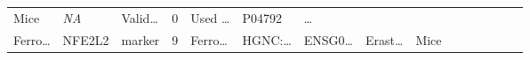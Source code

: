 \documentclass[
]{article}
\begin{document}
\begin{longtable}[]{@{}lllllllllllllll@{}}
\begin{minipage}[t]{0.04\columnwidth}
Mice\strut
\end{minipage} & \begin{minipage}[t]{0.05\columnwidth}\raggedright
\emph{NA}\strut
\end{minipage} & \begin{minipage}[t]{0.05\columnwidth}\raggedright
Valid\ldots{}\strut
\end{minipage} & \begin{minipage}[t]{0.05\columnwidth}\raggedright
0\strut
\end{minipage} & \begin{minipage}[t]{0.05\columnwidth}\raggedright
Used \ldots{}\strut
\end{minipage} & \begin{minipage}[t]{0.05\columnwidth}\raggedright
P04792\strut
\end{minipage} & \begin{minipage}[t]{0.02\columnwidth}\raggedright
\ldots{}\strut
\end{minipage}\tabularnewline
\begin{minipage}[t]{0.05\columnwidth}\raggedright
Ferro\ldots{}\strut
\end{minipage} & \begin{minipage}[t]{0.04\columnwidth}\raggedright
NFE2L2\strut
\end{minipage} & \begin{minipage}[t]{0.04\columnwidth}\raggedright
marker\strut
\end{minipage} & \begin{minipage}[t]{0.02\columnwidth}\raggedright
9\strut
\end{minipage} & \begin{minipage}[t]{0.05\columnwidth}\raggedright
Ferro\ldots{}\strut
\end{minipage} & \begin{minipage}[t]{0.05\columnwidth}\raggedright
HGNC:\ldots{}\strut
\end{minipage} & \begin{minipage}[t]{0.05\columnwidth}\raggedright
ENSG0\ldots{}\strut
\end{minipage} & \begin{minipage}[t]{0.05\columnwidth}\raggedright
Erast\ldots{}\strut
\end{minipage} & \begin{minipage}[t]{0.04\columnwidth}\raggedright
Mice\strut
\end{minipage} & \begin{minipage}[t]{0.05\columnwidth}\raggedright

\end{minipage}
\end{longtable}
\end{document}
